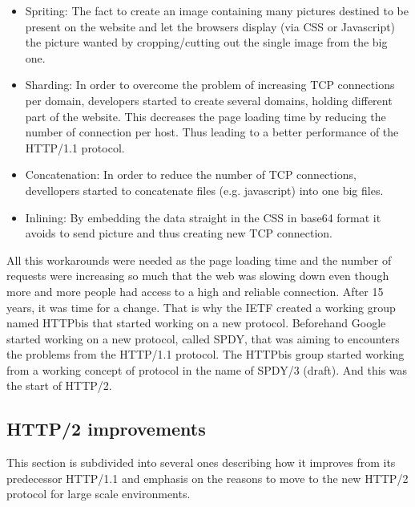 \begin{itemize}
\item Spriting: The fact to create an image containing many pictures destined to be present on the website and let the browsers display (via CSS or Javascript) the picture wanted by cropping/cutting out the single image from the big one.
\item Sharding: In order to overcome the problem of increasing TCP connections per domain, developers started to create several domains, holding different part of the website. This decreases the page loading time by reducing the number of connection per host. Thus leading to a better performance of the HTTP/1.1 protocol.
\item Concatenation: In order to reduce the number of TCP connections, devellopers started to concatenate files (e.g. javascript) into one big files. 
\item Inlining: By embedding the data straight in the CSS in base64 format it avoids to send picture and thus creating new TCP connection. 
\end{itemize}
All this workarounds were needed as the page loading time and the number of requests were increasing so much that the web was slowing down even though more and more people had access to a high and reliable connection. After 15 years, it was time for a change. That is why the IETF created a working group named HTTPbis that started working on a new protocol. Beforehand Google started working on a new protocol, called SPDY, that was aiming to encounters the problems from the HTTP/1.1 protocol. The HTTPbis group started working from a working concept of protocol in the name of SPDY/3 (draft). And this was the start of HTTP/2.

\subsection{HTTP/2 improvements}
This section is subdivided into several ones describing how it improves from its predecessor HTTP/1.1 and emphasis on the reasons to move to the new HTTP/2 protocol for large scale environments. 
